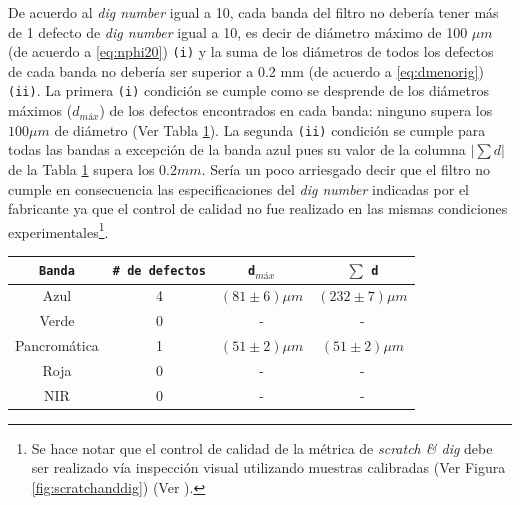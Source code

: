 De acuerdo al \textit{dig number} igual a 10, cada banda del filtro no debería tener más de 1 defecto de \textit{dig number} igual a 10, es decir de diámetro máximo de 100 $\mu m$  (de acuerdo a \ref{eq:nphi20}) \texttt{(i)} y la suma de los diámetros de todos los defectos de cada banda no debería ser superior a 0.2 mm (de acuerdo a \ref{eq:dmenorig}) \texttt{(ii)}. La primera \texttt{(i)} condición se cumple como se desprende de los diámetros máximos ($d_{máx}$) de los defectos encontrados en cada banda: ninguno supera los $100 \mu m$ de diámetro (Ver Tabla \ref{tabress}). La segunda \texttt{(ii)} condición se cumple para todas las bandas a excepción de la banda azul pues su valor de la columna $|\sum d |$ de la Tabla \ref{tabress} supera los $0.2 mm$. Sería un poco arriesgado decir que el filtro no cumple en consecuencia las especificaciones del \textit{dig number}  indicadas por el fabricante ya que el control de calidad no fue realizado en las mismas condiciones experimentales\footnote{Se hace notar que el control de calidad de la métrica de \textit{scratch \& dig} debe ser realizado vía inspección visual utilizando muestras calibradas (Ver Figura \ref{fig:scratchanddig}) (Ver \href{https://bit.ly/34cLMTk}{\faYoutubeSquare}).}.
 \begin{table}[H]
\begin{center}
\begin{tabular}{ |c|c|c|c| }    \toprule
\texttt{Banda} & \texttt{\# de defectos} & \texttt{d$_{máx}$} & $\sum$ \texttt{d}\\\midrule
\rowcolor{blue!15} Azul    & 4 & $(81 \pm 6)\mu m$ & $(232 \pm 7)\mu m$   \\ 
\rowcolor{green!50} Verde  & 0 & - & - \\ 
Pancromática& 1 & $(51 \pm 2)\mu m$ & $(51 \pm 2)\mu m$  \\
\rowcolor{red!50} Roja & 0 & -  & -  \\
\rowcolor{maroon!20} NIR & 0 & -  & - \\
\bottomrule
 \hline
\end{tabular}
\end{center}
 \label{tabress}
 \end{table}
